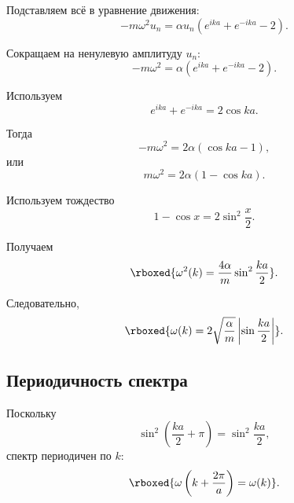 \documentclass[../final.tex]{subfiles}
\begin{document}
Подставляем всё в уравнение движения:
%
\begin{equation*}
    -m\omega^2u_n
    =
    \alpha u_n
    \left(
        e^{ika}
        +
        e^{-ika}
        -
        2
    \right).
\end{equation*}

Сокращаем на ненулевую амплитуду $u_n$:
%
\begin{equation*}
    -m\omega^2
    =
    \alpha
    \left(
        e^{ika}
        +
        e^{-ika}
        -
        2
    \right).
\end{equation*}

Используем
%
\begin{equation*}
    e^{ika}+e^{-ika}
    =
    2\cos ka.
\end{equation*}

Тогда
%
\begin{equation*}
    -m\omega^2
    =
    2\alpha
    \left(
        \cos ka-1
    \right),
\end{equation*}
%
или
%
\begin{equation*}
    m\omega^2
    =
    2\alpha
    \left(
        1-\cos ka
    \right).
\end{equation*}

Используем тождество
%
\begin{equation*}
    1-\cos x
    =
    2\sin^2\frac{x}{2}.
\end{equation*}

Получаем
%
\begin{equation*}
    \rboxed{
        \omega^2(k)
        =
        \frac{4\alpha}{m}
        \sin^2\frac{ka}{2}
    }.
\end{equation*}

Следовательно,
%
\begin{equation*}
    \rboxed{
        \omega(k)
        =
        2\sqrt{\frac{\alpha}{m}}
        \left|
            \sin\frac{ka}{2}
        \right|
    }.
\end{equation*}



\subsection*{Периодичность спектра}

Поскольку
%
\begin{equation*}
    \sin^2
    \left(
        \frac{ka}{2}+\pi
    \right)
    =
    \sin^2\frac{ka}{2},
\end{equation*}
%
спектр периодичен по $k$:
%
\begin{equation*}
    \rboxed{
        \omega
        \left(
            k+\frac{2\pi}{a}
        \right)
        =
        \omega(k)
    }.
\end{equation*}
\end{document}

